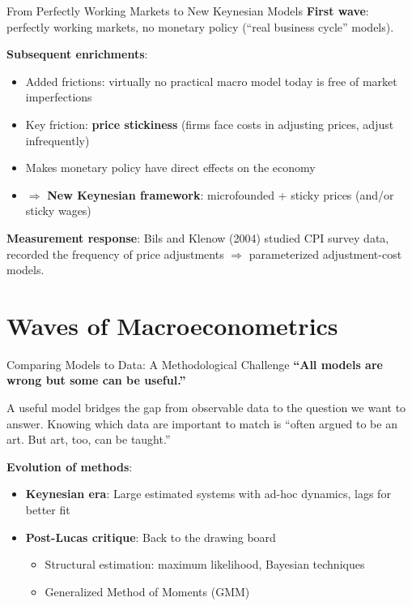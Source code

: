 \documentclass[blue]{beamer}
\begin{document}
\begin{frame}{From Perfectly Working Markets to New Keynesian Models}
	\textbf{First wave}: perfectly working markets, no monetary policy (``real business cycle'' models).
	
	\textbf{Subsequent enrichments}:
	\vspace{-6pt}
	\begin{itemize}
		\item Added frictions: virtually no practical macro model today is free of market imperfections
		\item Key friction: \textbf{price stickiness} (firms face costs in adjusting prices, adjust infrequently)
		\item Makes monetary policy have direct effects on the economy
		\item $\Rightarrow$ \textbf{New Keynesian framework}: microfounded + sticky prices (and/or sticky wages)
	\end{itemize}
	

	\textbf{Measurement response}: Bils and Klenow (2004) studied CPI survey data, recorded the frequency of price adjustments $\Rightarrow$ parameterized adjustment-cost models.
\end{frame}

\section{Waves of Macroeconometrics}

\begin{frame}{Comparing Models to Data: A Methodological Challenge}
	\textbf{``All models are wrong but some can be useful.''}
	
	\bigskip
	A useful model bridges the gap from observable data to the question we want to answer. Knowing which data are important to match is ``often argued to be an art. But art, too, can be taught.''
	
	\bigskip
	\textbf{Evolution of methods}:
	\begin{itemize}
		\item \textbf{Keynesian era}: Large estimated systems with ad-hoc dynamics, lags for better fit
		\item \textbf{Post-Lucas critique}: Back to the drawing board
		\begin{itemize}
			\item Structural estimation: maximum likelihood, Bayesian techniques
			\item Generalized Method of Moments (GMM)
		\end{itemize}
	\end{itemize}
\end{frame}
\end{document}
